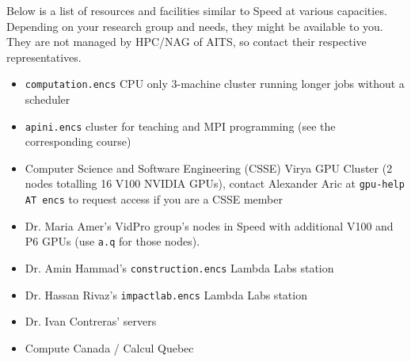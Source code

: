 \documentclass{easychair}
\begin{document}
Below is a list of resources and facilities similar to Speed at various capacities.
Depending on your research group and needs, they might be available to you. They
are not managed by HPC/NAG of AITS, so contact their respective representatives.

\begin{itemize}
\item
\texttt{computation.encs} CPU only 3-machine cluster running longer jobs
without a scheduler
\item
\texttt{apini.encs} cluster for teaching and MPI programming (see the corresponding
course)
\item
Computer Science and Software Engineering (CSSE) Virya GPU Cluster
(2 nodes totalling 16 V100 NVIDIA GPUs), contact Alexander Aric at \texttt{gpu-help AT encs}
to request access if you are a CSSE member
\item
Dr. Maria Amer's VidPro group's nodes in Speed with additional V100 and P6 GPUs
(use \texttt{a.q} for those nodes).
\item
Dr. Amin Hammad's \texttt{construction.encs} Lambda Labs station
\item
Dr. Hassan Rivaz's \texttt{impactlab.encs} Lambda Labs station
\item
Dr. Ivan Contreras' servers
\item
Compute Canada / Calcul Quebec
\end{itemize}


%
\nocite{aosa-book-vol1}
\label{sect:bib}
%

%
%
%
\clearpage
{} 


\end{document}
